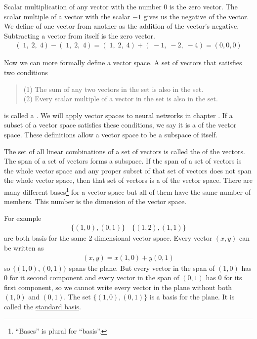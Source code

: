    Scalar multiplication of any vector with the number $0$ is the zero vector.
The scalar multiple of a vector with the scalar $-1$ gives us the negative
of the vector. We define  of one vector from 
another as the addition of the vector's negative. Subtracting a vector from 
itself is the zero vector.
\begin{eqnarray*}
  (\; 1, \; 2, \; 4) - (\; 1, \; 2, \; 4) = 
  (\; 1, \; 2, \; 4) + (\; -1, \; -2, \; -4) = (0,0,0)
\end{eqnarray*}

 Now we can more formally define a vector space. A set of vectors that satisfies two conditions
\begin{quote}
(1) The sum of any two vectors in the set is also in the set.\\
(2) Every scalar multiple of a vector in the set is also in the set. 
\end{quote}
is called a . We will apply vector spaces to neural 
networks in chapter . If a subset of a vector space satisfies these 
conditions, we say it is a  of the vector space. These 
definitions allow a vector space to be a subspace of itself. 

   The set of all linear combinations of a set of vectors is called the 
 of the vectors. The span of a set of vectors forms a 
subspace. If the span of a set of vectors is the whole vector space and any
proper subset of that set of vectors does not span the whole vector space, then 
that set of vectors is a  of the vector space. There are
many different bases\footnote{``Bases'' is plural for ``basis''.} for a vector space but 
all of them have the same number of members. This number is the dimension of 
the vector space. 

   For example
\begin{eqnarray*}
\{ (1,0), (0,1) \} \quad \{ (1,2), (1,1) \}
\end{eqnarray*}
are both basis for the same 2 dimensional vector space. Every vector $(x,y)$
can be written as
\begin{eqnarray*}
(x,y) = x(1,0)+y(0,1)
\end{eqnarray*}  
so $\{ (1,0), (0,1) \}$ spans the plane. But every vector in the span of
$(1,0)$ has $0$ for it second component and every vector in the span of $(0,1)$
has $0$ for its first component, so we cannot write every vector in the plane 
without both $(1,0)$ and $(0,1)$. The set $\{ (1,0), (0,1) \}$ is a basis for 
the plane. It is called the \underline{standard basis}. 

